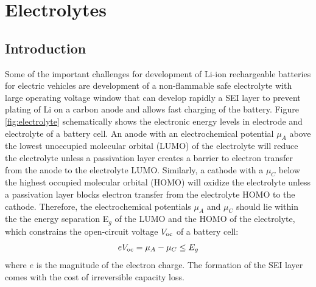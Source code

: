 \documentclass[../main.tex]{subfiles}
\begin{document}
\section{Electrolytes}
\subsection{Introduction}%
Some of the important challenges for development of Li-ion rechargeable batteries for electric vehicles are development of a non-flammable safe electrolyte with large operating voltage window that can develop rapidly a SEI layer to prevent plating of Li on a carbon anode and allows fast charging of the battery.\cite{Goodenough2010} Figure \ref{fig:electrolyte} schematically shows the electronic energy levels in electrode and electrolyte of a battery cell. An anode with an electrochemical potential $\mu_{A}$ above the lowest unoccupied molecular orbital (LUMO) of the electrolyte will reduce the electrolyte unless a passivation layer creates a barrier to electron transfer from the anode to the electrolyte LUMO. Similarly, a cathode with a $\mu_{C}$ below the highest occupied molecular orbital (HOMO) will oxidize the electrolyte unless a passivation layer blocks electron transfer from the electrolyte HOMO to the cathode. Therefore, the electrochemical potentials $\mu_{A}$ and $\mu_{C}$ should lie within the the energy separation E$_g$ of the LUMO and the HOMO of the electrolyte, which constrains the open-circuit voltage $V_{\rm oc}$ of a battery cell:
\begin{equation}
    eV_{\rm oc}=\mu_{A}-\mu_{C}\leq E_{g}
\end{equation}
where $e$ is the magnitude of the electron charge. %
The formation of the SEI layer comes with the cost of irreversible capacity loss.
\end{document}
